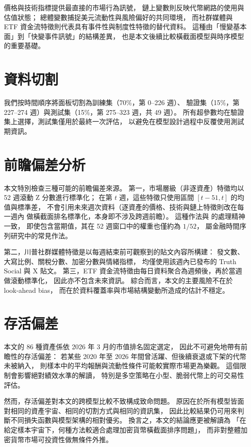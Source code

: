 價格與技術指標提供最直接的市場行為訊號，
鏈上變數則反映代幣網路的使用與估值狀態；
總體變數捕捉美元流動性與風險偏好的共同環境，
而社群媒體與 ETF 資金流特徵則代表具有事件性與制度性特徵的替代資料。
這種由「慢變基本面」到「快變事件訊號」的結構差異，
也是本文後續比較橫截面模型與時序模型的重要基礎。

\section{資料切割}
\label{sec:data:splits}

我們按時間順序將面板切割為訓練集（70\%，第 0--226 週）、
驗證集（15\%，第 227--274 週）與測試集（15\%，第 275--323 週，共 49 週）。
所有超參數均在驗證集上選擇，測試集僅用於最終一次評估，
以避免在模型設計過程中反覆使用測試期資訊。

\section{前瞻偏差分析}
\label{sec:data:lookahead}

本文特別檢查三種可能的前瞻偏差來源。
第一，市場層級（非逐資產）特徵均以 52 週滾動 Z 分數進行標準化；
在第 $t$ 週，這些特徵只使用區間 $[t-51, t]$ 的均值與標準差，
不會引用未來週次資料（逐資產的價格、技術與鏈上特徵則改在每一週內
做橫截面排名標準化，本身即不涉及跨週前瞻）。
這種作法與 \citet{gu2020empirical} 的處理精神一致，
即使包含當期值，其在 52 週窗口中的權重也僅約為 $1/52$，
屬金融時間序列研究中的常見作法。

第二，川普社群媒體特徵是以每週結束前可觀察到的貼文內容所構建：
發文數、大寫比例、關稅分數、加密分數與情緒指標，
均僅使用該週內已發布的 Truth Social 與 X 貼文。
第三，ETF 資金流特徵由每日資料聚合為週頻後，再於當週做滾動標準化，
因此亦不包含未來資訊。
綜合而言，本文的主要風險不在於 look-ahead bias，
而在於資料覆蓋率與市場結構變動所造成的估計不穩定。

\section{存活偏差}
\label{sec:data:survival}

本文的 86 種資產係依 2026 年 3 月的市值排名固定選定，
因此不可避免地帶有前瞻性的存活偏差：
若某些 2020 年至 2026 年間曾活躍、但後續衰退或下架的代幣未被納入，
則樣本中的平均報酬與流動性條件可能較實際市場更為樂觀。
這個限制會影響絕對績效水準的解讀，
特別是多空策略在小型、脆弱代幣上的可交易性評估。

然而，存活偏差對本文的跨模型比較不致構成致命問題。
原因在於所有模型皆面對相同的資產宇宙、相同的切割方式與相同的資訊集，
因此比較結果仍可用來判斷不同損失函數與模型架構的相對優劣。
換言之，本文的結論應更被解讀為
「在給定樣本宇宙下，何種方法較適合處理加密貨幣橫截面排序問題」，
而非對整體加密貨幣市場可投資性做無條件外推。
